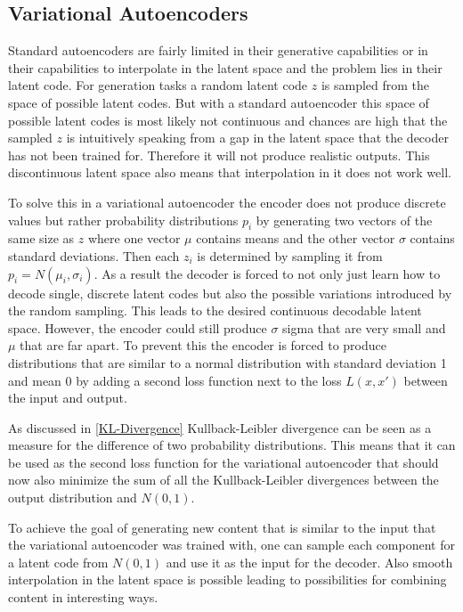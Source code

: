 \subsection{Variational Autoencoders} \label{vae_background}

Standard autoencoders are fairly limited in their generative capabilities or in their capabilities
to interpolate in the latent space and the problem lies
in their latent code. For generation tasks a random latent code $z$ is sampled from the space of
possible latent codes. But with a standard autoencoder this space of possible latent codes is most
likely not continuous and chances are high that the sampled $z$ is intuitively speaking
from a gap in the latent space that the decoder has not been trained for. Therefore it will not
produce realistic outputs. This discontinuous latent space also means that interpolation in it
does not work well.

To solve this in a variational autoencoder the encoder does not produce discrete values but rather
probability distributions $p_{i}$ by generating two vectors of the same size as $z$ where one vector $\mu$
contains means and the other vector $\sigma$ contains standard deviations.
Then each $z_{i}$ is determined by sampling it from $p_{i}=N(\mu_{i},\sigma_{i})$.
As a result the decoder is forced to not 
only just learn how to decode single, discrete latent codes but also the possible variations
introduced by the random sampling. This leads to the desired continuous decodable latent space.
However, the encoder could still produce $\sigma$ sigma that are very small and $\mu$ that are far apart.
To prevent this the encoder is forced to produce distributions that are similar to a normal
distribution with standard deviation 1 and mean 0 by adding a second loss function next to the
loss $L(x,x')$ between the input and output.

As discussed in \ref{KL-Divergence} Kullback-Leibler divergence can be seen as a measure for the
difference of two probability distributions. This means that it can be used as the second loss
function for the variational autoencoder that should now also minimize the sum
of all the Kullback-Leibler divergences between the output distribution and $N(0,1)$.

To achieve the goal of generating new content that is similar to the input that the variational 
autoencoder was trained with, one can sample each component for a latent code from $N(0,1)$ and
use it as the input for the decoder.
Also smooth interpolation in the latent space is possible leading to possibilities for combining
content in interesting ways.

